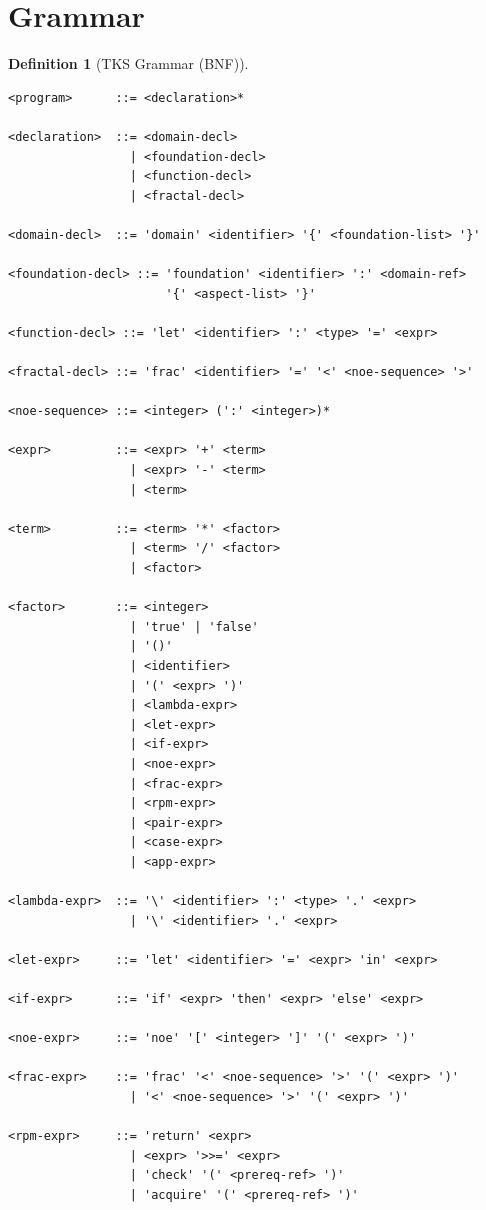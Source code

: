 \documentclass[11pt,twoside,openright]{book}
\theoremstyle{definition}
\newtheorem{definition}{Definition}[chapter]
\theoremstyle{plain}
\theoremstyle{remark}
\begin{document}
\section{Grammar}

\begin{definition}[TKS Grammar (BNF)]
\label{def:tks-grammar}
\begin{verbatim}
<program>      ::= <declaration>*

<declaration>  ::= <domain-decl>
                 | <foundation-decl>
                 | <function-decl>
                 | <fractal-decl>

<domain-decl>  ::= 'domain' <identifier> '{' <foundation-list> '}'

<foundation-decl> ::= 'foundation' <identifier> ':' <domain-ref>
                      '{' <aspect-list> '}'

<function-decl> ::= 'let' <identifier> ':' <type> '=' <expr>

<fractal-decl> ::= 'frac' <identifier> '=' '<' <noe-sequence> '>'

<noe-sequence> ::= <integer> (':' <integer>)*

<expr>         ::= <expr> '+' <term>
                 | <expr> '-' <term>
                 | <term>

<term>         ::= <term> '*' <factor>
                 | <term> '/' <factor>
                 | <factor>

<factor>       ::= <integer>
                 | 'true' | 'false'
                 | '()'
                 | <identifier>
                 | '(' <expr> ')'
                 | <lambda-expr>
                 | <let-expr>
                 | <if-expr>
                 | <noe-expr>
                 | <frac-expr>
                 | <rpm-expr>
                 | <pair-expr>
                 | <case-expr>
                 | <app-expr>

<lambda-expr>  ::= '\' <identifier> ':' <type> '.' <expr>
                 | '\' <identifier> '.' <expr>

<let-expr>     ::= 'let' <identifier> '=' <expr> 'in' <expr>

<if-expr>      ::= 'if' <expr> 'then' <expr> 'else' <expr>

<noe-expr>     ::= 'noe' '[' <integer> ']' '(' <expr> ')'

<frac-expr>    ::= 'frac' '<' <noe-sequence> '>' '(' <expr> ')'
                 | '<' <noe-sequence> '>' '(' <expr> ')'

<rpm-expr>     ::= 'return' <expr>
                 | <expr> '>>=' <expr>
                 | 'check' '(' <prereq-ref> ')'
                 | 'acquire' '(' <prereq-ref> ')'


\end{verbatim}
\end{definition}
\end{document}
